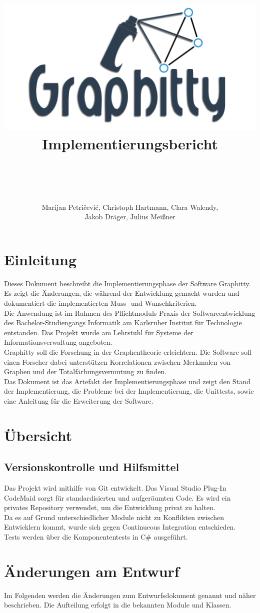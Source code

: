 \documentclass[13pt]{scrreprt}
\title{
	\includegraphics[scale=0.5,center]{OfficialLogo.png}
	\\
Implementierungsbericht
}
\author{\\ \\ \\ \\ Marijan Petričević, Christoph Hartmann, Clara Walendy,\\
	 Jakob Dräger, Julius Meißner}
\begin{document}
\maketitle

\tableofcontents

\chapter{Einleitung}
Dieses Dokument beschreibt die Implementierungsphase der Software Graphitty.
Es zeigt die Änderungen, die während der Entwicklung gemacht wurden und dokumentiert die implementierten Muss- und Wunschkriterien.\\
Die Anwendung ist im Rahmen des Pflichtmoduls Praxis der Softwareentwicklung des Bachelor-Studiengangs Informatik am Karlsruher Institut für Technologie entstanden. Das Projekt wurde am Lehrstuhl für Systeme der Informationsverwaltung angeboten.\\ Graphitty soll die Forschung in der Graphentheorie erleichtern. Die Software soll einen Forscher dabei unterstützen Korrelationen zwischen Merkmalen von Graphen und der Totalfärbungsvermutung zu finden.\\
Das Dokument ist das Artefakt der Implementierungsphase und zeigt den Stand der Implementierung, die Probleme bei der Implementierung, die Unittests, sowie eine Anleitung für die Erweiterung der Software.

\chapter{Übersicht}
\section{Versionskontrolle und Hilfsmittel}
Das Projekt wird mithilfe von Git entwickelt. Das Visual Studio Plug-In CodeMaid sorgt für standardisierten und aufgeräumten Code.
Es wird ein privates Repository verwendet, um die Entwicklung privat zu halten.\\
Da es auf Grund unterschiedlicher Module nicht zu Konflikten zwischen Entwicklern kommt, wurde sich gegen Continueous Integration entschieden.\\
Tests werden über die Komponententests in C\# ausgeführt.


\chapter{Änderungen am Entwurf}
Im Folgenden werden die Änderungen zum Entwurfsdokument genannt und näher beschrieben.
Die Aufteilung erfolgt in die bekannten Module und Klassen.
\end{document}
